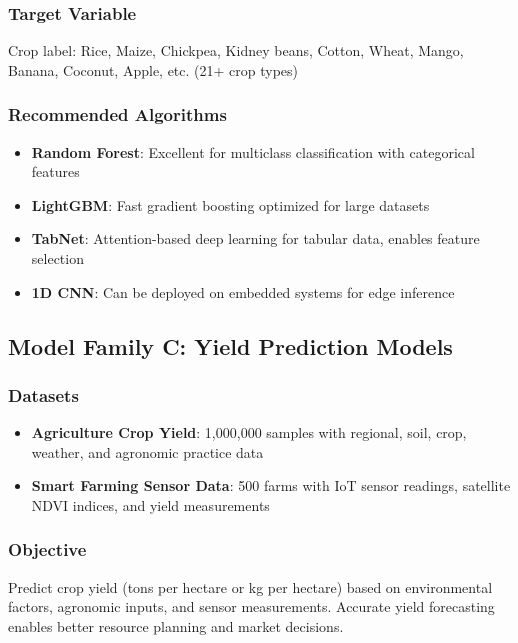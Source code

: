 \documentclass[conference]{IEEEtran}
\begin{document}
\subsubsection{Target Variable}
Crop label: Rice, Maize, Chickpea, Kidney beans, Cotton, Wheat, Mango, Banana, Coconut, Apple, etc. (21+ crop types)

\subsubsection{Recommended Algorithms}
\begin{itemize}
\item \textbf{Random Forest}: Excellent for multiclass classification with categorical features
\item \textbf{LightGBM}: Fast gradient boosting optimized for large datasets
\item \textbf{TabNet}: Attention-based deep learning for tabular data, enables feature selection
\item \textbf{1D CNN}: Can be deployed on embedded systems for edge inference
\end{itemize}

\subsection{Model Family C: Yield Prediction Models}

\subsubsection{Datasets}
\begin{itemize}
\item \textbf{Agriculture Crop Yield}: 1,000,000 samples with regional, soil, crop, weather, and agronomic practice data
\item \textbf{Smart Farming Sensor Data}: 500 farms with IoT sensor readings, satellite NDVI indices, and yield measurements
\end{itemize}

\subsubsection{Objective}
Predict crop yield (tons per hectare or kg per hectare) based on environmental factors, agronomic inputs, and sensor measurements. Accurate yield forecasting enables better resource planning and market decisions.
\end{document}
